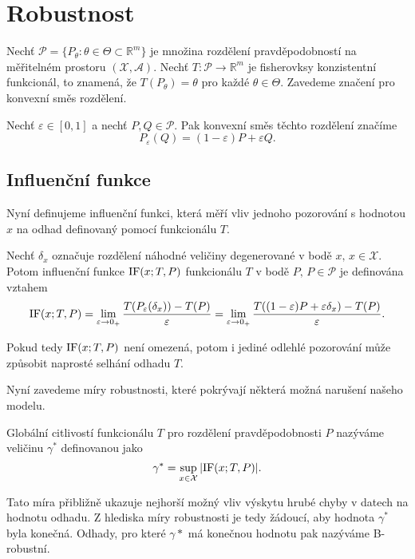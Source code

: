 \chapter{Robustnost}

Nech\v{t} $\mathcal{P} = \lbrace P_\theta : \theta \in \Theta \subset \mathbb{R}^m \rbrace$ je množina rozdělení pravděpodobností na měřitelném prostoru $\left(\mathcal{X},\mathcal{A}\right)$. Nech\v{t} $T: \mathcal{P} \rightarrow \mathbb{R}^m$ je fisherovksy konzistentní funkcionál, to znamená, že $T(P_\theta) = \theta$ pro každé $\theta \in \Theta$. Zavedeme značení pro konvexní směs rozdělení. 

\begin{definition}
	Nech\v{t} $\varepsilon \in [0,1]$ a nech\v{t} $P, Q \in \mathcal{P}$. Pak konvexní směs těchto rozdělení značíme 
	\begin{equation}
		P_\varepsilon(Q) = (1-\varepsilon)P + \varepsilon Q.
		\label{konvex-smes}
	\end{equation}
\end{definition}

\section{Influenční funkce}
\noindent
Nyní definujeme influenční funkci, která měří vliv jednoho pozorování s hodnotou $x$ na odhad definovaný pomocí funkcionálu $T$. 

\begin{definition}
	Nech\v{t} $\delta_x$ označuje rozdělení náhodné veličiny degenerované v bodě $x,\, x \in \mathcal{X}$. Potom influenční funkce $\mathrm{IF}({x};T,P)$ funkcionálu $T$ v bodě $P,\, P \in \mathcal{P}$ je definována vztahem
	\begin{equation}
		\mathrm{IF}({x};T,P) = \lim_{\varepsilon \rightarrow 0_+} \frac{T(P_\varepsilon(\delta_x)) - T(P)}{\varepsilon} = \lim_{\varepsilon \rightarrow 0_+} \frac{T((1-\varepsilon)P + \varepsilon\delta_x) - T(P)}{\varepsilon}.
	\end{equation} 
\end{definition}

\noindent
Pokud tedy $\mathrm{IF}({x};T,P)$ není omezená, potom i jediné odlehlé pozorování může způsobit naprosté selhání odhadu $T$. 

Nyní zavedeme míry robustnosti, které pokrývají některá možná narušení našeho modelu. 

\begin{definition}
	Globální citlivostí funkcionálu $T$ pro rozdělení pravděpodobnosti $P$ nazýváme veličinu $\gamma^*$ definovanou jako
	\begin{equation}
		\gamma^* = \sup_{x \in \mathcal{X}} |\mathrm{IF}({x};T,P)|.
	\end{equation}
\end{definition}
Tato míra přibližně ukazuje nejhorší možný vliv výskytu hrubé chyby v datech na hodnotu odhadu. Z hlediska míry robustnosti je tedy žádoucí, aby hodnota $\gamma^*$ byla konečná. Odhady, pro které $\gamma*$ má konečnou hodnotu pak nazýváme B-robustní.

